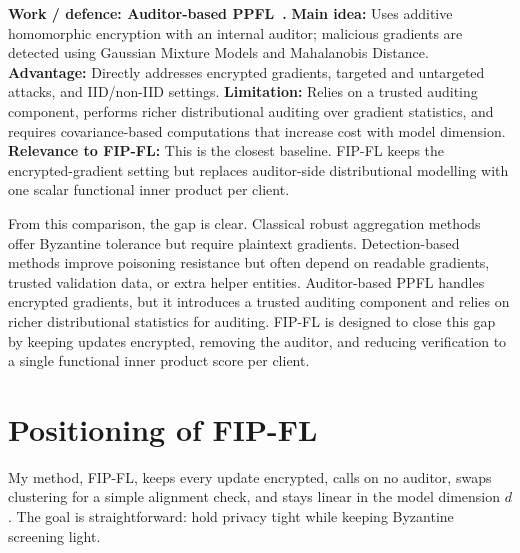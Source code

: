 \noindent\textbf{Work / defence: Auditor-based PPFL~\cite{yazdinejad2024robust}.}
\textbf{Main idea:} Uses additive homomorphic encryption with an internal auditor; malicious gradients are detected using Gaussian Mixture Models and Mahalanobis Distance.
\textbf{Advantage:} Directly addresses encrypted gradients, targeted and untargeted attacks, and IID/non-IID settings.
\textbf{Limitation:} Relies on a trusted auditing component, performs richer distributional auditing over gradient statistics, and requires covariance-based computations that increase cost with model dimension.
\textbf{Relevance to FIP-FL:} This is the closest baseline. FIP-FL keeps the encrypted-gradient setting but replaces auditor-side distributional modelling with one scalar functional inner product per client.

From this comparison, the gap is clear. Classical robust aggregation methods offer Byzantine tolerance but require plaintext gradients. Detection-based methods improve poisoning resistance but often depend on readable gradients, trusted validation data, or extra helper entities. Auditor-based PPFL handles encrypted gradients, but it introduces a trusted auditing component and relies on richer distributional statistics for auditing. FIP-FL is designed to close this gap by keeping updates encrypted, removing the auditor, and reducing verification to a single functional inner product score per client.

\section{Positioning of FIP-FL}
\label{sec:lit-position}

My method, FIP-FL, keeps every update encrypted, calls on no auditor, swaps clustering for a simple alignment check, and stays linear in the model dimension $d$. The goal is straightforward: hold privacy tight while keeping Byzantine screening light.
